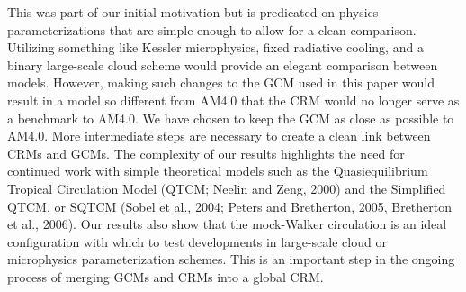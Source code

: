 \documentclass[draft]{agujournal2019}
\begin{document}
{This was part of our initial motivation but is predicated on physics parameterizations that are simple enough 
to allow for a clean comparison. 
Utilizing something like Kessler microphysics, 
fixed radiative cooling, and a binary large-scale cloud scheme would provide an elegant comparison between 
models.  However, making such changes to the GCM used in this paper would result in a model so different from AM4.0 
that the CRM would no longer serve as a benchmark to AM4.0.   We have chosen to keep the GCM as close as 
possible to AM4.0.
More intermediate steps are necessary to create a clean link between CRMs and GCMs.  
The complexity of our results highlights the need for continued work with simple theoretical models such as the 
Quasiequilibrium Tropical Circulation Model (QTCM; Neelin and Zeng, 2000) and the Simplified QTCM, or SQTCM 
(Sobel et al., 2004; Peters and Bretherton, 2005, Bretherton et al., 2006).  
Our results also show that the mock-Walker circulation is an ideal configuration with which to test developments in 
large-scale cloud or microphysics parameterization schemes.  
This is an important step in the ongoing process of merging GCMs and CRMs into a global CRM.   


}
\end{document}
